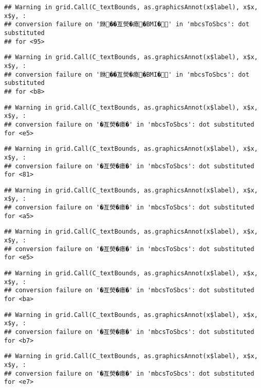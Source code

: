 \documentclass[
]{article}
\begin{document}
\begin{verbatim}
## Warning in grid.Call(C_textBounds, as.graphicsAnnot(x$label), x$x, x$y, :
## conversion failure on '銝��亙熒�瘜�BMI�' in 'mbcsToSbcs': dot substituted
## for <95>
\end{verbatim}

\begin{verbatim}
## Warning in grid.Call(C_textBounds, as.graphicsAnnot(x$label), x$x, x$y, :
## conversion failure on '銝��亙熒�瘜�BMI�' in 'mbcsToSbcs': dot substituted
## for <b8>
\end{verbatim}

\begin{verbatim}
## Warning in grid.Call(C_textBounds, as.graphicsAnnot(x$label), x$x, x$y, :
## conversion failure on '�亙熒�瘜�' in 'mbcsToSbcs': dot substituted for <e5>
\end{verbatim}

\begin{verbatim}
## Warning in grid.Call(C_textBounds, as.graphicsAnnot(x$label), x$x, x$y, :
## conversion failure on '�亙熒�瘜�' in 'mbcsToSbcs': dot substituted for <81>
\end{verbatim}

\begin{verbatim}
## Warning in grid.Call(C_textBounds, as.graphicsAnnot(x$label), x$x, x$y, :
## conversion failure on '�亙熒�瘜�' in 'mbcsToSbcs': dot substituted for <a5>
\end{verbatim}

\begin{verbatim}
## Warning in grid.Call(C_textBounds, as.graphicsAnnot(x$label), x$x, x$y, :
## conversion failure on '�亙熒�瘜�' in 'mbcsToSbcs': dot substituted for <e5>
\end{verbatim}

\begin{verbatim}
## Warning in grid.Call(C_textBounds, as.graphicsAnnot(x$label), x$x, x$y, :
## conversion failure on '�亙熒�瘜�' in 'mbcsToSbcs': dot substituted for <ba>
\end{verbatim}

\begin{verbatim}
## Warning in grid.Call(C_textBounds, as.graphicsAnnot(x$label), x$x, x$y, :
## conversion failure on '�亙熒�瘜�' in 'mbcsToSbcs': dot substituted for <b7>
\end{verbatim}

\begin{verbatim}
## Warning in grid.Call(C_textBounds, as.graphicsAnnot(x$label), x$x, x$y, :
## conversion failure on '�亙熒�瘜�' in 'mbcsToSbcs': dot substituted for <e7>
\end{verbatim}
\end{document}
